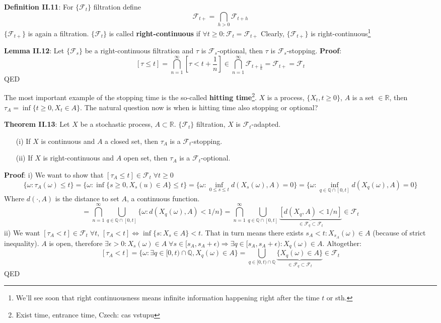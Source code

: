 \documentclass[english]{article}
\newcommand{\R}{\mathbb{R}}
\newcommand{\ub}{\underbrace}
\newcommand{\note}[1]{\noindent\textbf{#1}}
\newcommand{\F}{\mathcal F}
\begin{document}
\note{Definition II.11}: For $\{\F_t\}$ filtration define $$\F_{t+} = \bigcap_{h>0} \F_{t+h}$$
$\{\F_{t+}\}$ is again a filtration. \newline
$\{\F_t\}$ is called \textbf{right-continuous} if $\forall t\geq 0: \F_t = \F_{t+}$ \newline
Clearly, $\{\F_{t+}\}$ is right-continuous\footnote{We'll see soon that right continuousness means infinite information happening right after the time $t$ or sth.} \newline

\note{Lemma II.12}: Let $\{\F_s\}$ be a right-continuous filtration and $\tau$ is $\F_s$-optional, then $\tau$ is $\F_s$-stopping. \newline 
\note{Proof}: $$[\tau \leq t] = \bigcap^\infty_{n=1} [\tau < t + \frac 1n] \in \bigcap^\infty_{n=1} \F_{t+\frac 1n} = \F_{t+} = \F_t$$
QED \newline

The most important example of the stopping time is the so-called \textbf{hitting time}\footnote{Exist time, entrance time, Czech: cas vstupu}. \newline
$X$ is a process, $\{X_t, t\geq 0\}$, $A$ is a set $\in \R$, then $\tau_A = \inf\{t\geq 0, X_t \in A\}$. \newline
The natural question now is when is hitting time also stopping or optional? \newline

\note{Theorem II.13}: Let $X$ be a stochastic process, $A\subset \R$. $\{\F_t\}$ filtration, $X$ is $\F_t$-adapted. \begin{enumerate}
\item[(i)] If $X$ is continuous and $A$ a closed set, then $\tau_A$ is a $\F_t$-stopping.
\item[(ii)] If $X$ is right-continuous and $A$ open set, then $\tau_A$ is a $\F_t$-optional.
\end{enumerate}
\note{Proof}: i) We want to show that $[\tau_A \leq t] \in \F_t\; \forall t \geq 0$
$$\{\omega: \tau_A(\omega) \leq t\} = \{\omega: \inf\{s\geq 0, X_s(u) \in A \} \leq t \} = \{\omega: \inf_{0\leq s \leq t} d(X_s(\omega), A) = 0\} = \{ \omega: \inf_{q \in \mathbb Q \cap [0,t]} d(X_q (\omega) , A) = 0\} $$
Where $d(\cdot , A)$ is the distance to set $A$, a continuous function.
$$=\bigcap^\infty_{n=1} \bigcup_{q \in \mathbb Q \cap [0,t]} \{\omega: d(X_q(\omega), A) < 1/n \}=\bigcap^\infty_{n=1} \bigcup_{q\in \mathbb Q\cap [0,t]} \ub{[d(X_q,A) < 1/n]}_{\in \F_q \subset \F_t} \in \F_t$$
ii) We want $[\tau_A < t] \in \F_t \; \forall t$, $[\tau_A < t] \iff \inf\{s: X_s \in A\} < t$. That in turn means there exists $s_A < t: X_{s_A}(\omega) \in A$ (because of strict inequality). $A$ is open, therefore $\exists \epsilon> 0: X_s(\omega) \in A \; \forall s \in [s_A, s_A + \epsilon) \Rightarrow \exists q \in [s_A, s_A + \epsilon): X_q(\omega) \in A$. Altogether:
$$[\tau_A < t] = \{\omega: \exists q \in [0,t) \cap \mathbb Q, X_q (\omega) \in A\} = \bigcup_{q\in [0,t) \cap \mathbb Q} \ub{\{ X_q(\omega) \in A \}}_{\in \F_q \subset \F_t} \in \F_t$$
QED\newline
\end{document}
